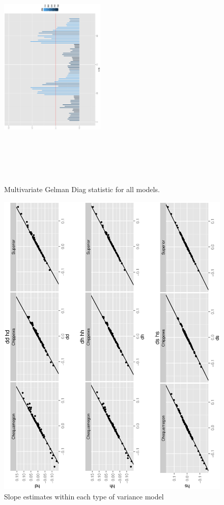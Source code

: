 \documentclass{article}
\begin{document}
\begin{figure}[h!]
\centering
\includegraphics[height=12cm, width=5cm, angle=-90]{gelman.ps}
\caption{Multivariate Gelman Diag statistic for all models. \label{gel1}}
\end{figure}


\begin{figure}[h!]
\centering
\includegraphics[scale=.6, angle=-90]{slp_bet.ps}
\caption{ Slope estimates within each type of variance model}
\end{figure} 
\end{document}
